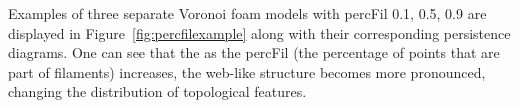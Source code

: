 \documentclass[12pt]{article}
\newcommand{\figref}[1]{Figure~\ref{#1}}
\begin{document}


Examples of three separate Voronoi foam models with percFil 0.1, 0.5, 0.9 are displayed in \figref{fig:percfilexample} along with their corresponding persistence diagrams. One can see that the as the percFil (the percentage of points that are part of filaments) increases, the web-like structure becomes more pronounced, changing the distribution of topological features.
\end{document}
